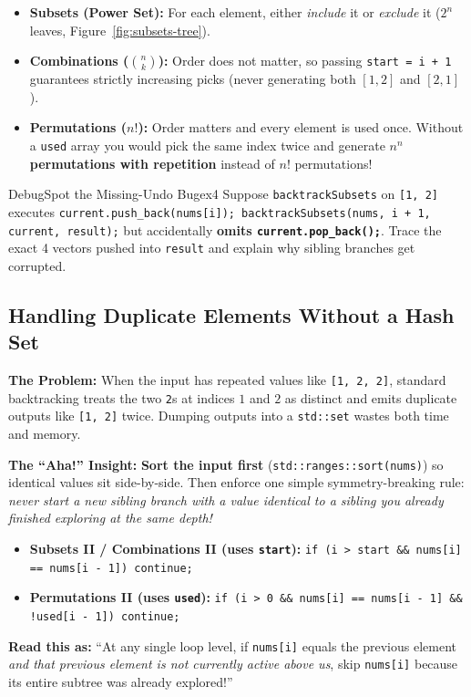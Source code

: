 \documentclass[11pt,a4paper]{article}
\theoremstyle{definition}
\newcommand{\painbeat}{\textbf{\color{accentamber}The Problem:} }
\newcommand{\ahabeat}{\textbf{\color{accentteal}The ``Aha!'' Insight:} }
\begin{document}
\begin{itemize}
    \item \textbf{Subsets (Power Set):} For each element, either \emph{include} it or \emph{exclude} it ($2^n$ leaves, Figure~\ref{fig:subsets-tree}).
    \item \textbf{Combinations ($\binom{n}{k}$):} Order does not matter, so passing \texttt{start = i + 1} guarantees strictly increasing picks (never generating both $[1, 2]$ and $[2, 1]$).
    \item \textbf{Permutations ($n!$):} Order matters and every element is used once. Without a \texttt{used} array you would pick the same index twice and generate $n^n$ \textbf{permutations with repetition} instead of $n!$ permutations!
\end{itemize}

\begin{tryitbox}{Debug}{Spot the Missing-Undo Bug}{ex4}
Suppose \texttt{backtrackSubsets} on \texttt{[1, 2]} executes \texttt{current.push\_back(nums[i]); backtrackSubsets(nums, i + 1, current, result);} but accidentally \textbf{omits \texttt{current.pop\_back();}}. Trace the exact 4 vectors pushed into \texttt{result} and explain why sibling branches get corrupted.
\end{tryitbox}

\subsection{Handling Duplicate Elements Without a Hash Set}

\painbeat When the input has repeated values like \texttt{[1, 2, 2]}, standard backtracking treats the two \texttt{2}s at indices $1$ and $2$ as distinct and emits duplicate outputs like \texttt{[1, 2]} twice. Dumping outputs into a \texttt{std::set} wastes both time and memory.

\ahabeat \textbf{Sort the input first} (\texttt{std::ranges::sort(nums)}) so identical values sit side-by-side. Then enforce one simple symmetry-breaking rule: \emph{never start a new sibling branch with a value identical to a sibling you already finished exploring at the same depth!}

\begin{formulabox}
\begin{itemize}
    \item \textbf{Subsets II / Combinations II (uses \texttt{start}):}
    \quad \texttt{if (i > start \&\& nums[i] == nums[i - 1]) continue;}
    \item \textbf{Permutations II (uses \texttt{used}):}
    \quad \texttt{if (i > 0 \&\& nums[i] == nums[i - 1] \&\& !used[i - 1]) continue;}
\end{itemize}
\textbf{Read this as:} ``At any single loop level, if \texttt{nums[i]} equals the previous element \emph{and that previous element is not currently active above us}, skip \texttt{nums[i]} because its entire subtree was already explored!''
\end{formulabox}
\end{document}
